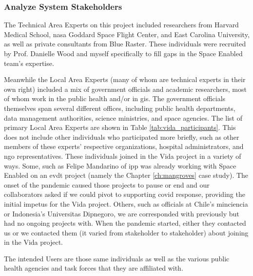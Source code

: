 \subsubsection{Analyze System Stakeholders}

The Technical Area Experts on this project included researchers from Harvard Medical School, \ac{nasa} Goddard Space Flight Center, and East Carolina University, as well as private consultants from Blue Raster. These individuals were recruited by Prof. Danielle Wood and myself specifically to fill gaps in the Space Enabled team's expertise.

Meanwhile the Local Area Experts (many of whom are technical experts in their own right) included a mix of government officials and academic researchers, most of whom work in the public health and/or in \ac{gis}. The government officials themselves span several different offices, including public health departments, data management authorities, science ministries, and space agencies. The list of primary Local Area Experts are shown in Table \ref{tab:vida_participants}. This does not include other individuals who participated more briefly, such as other members of these experts' respective organizations, hospital administrators, and \ac{ngo} representatives. These individuals joined in the Vida project in a variety of ways. Some, such as Felipe Mandarino of \ac{ipp} was already working with Space Enabled on an \ac{evdt} project (namely the Chapter \ref{ch:mangroves} case study). The onset of the pandemic caused those projects to pause or end and our collaborators asked if we could pivot to supporting \ac{covid} response, providing the initial impetus for the Vida project. Others, such as officials at Chile's \ac{minciencia} or Indonesia's Universitas Dipnegoro, we are corresponded with previously but had no ongoing projects with. When the pandemic started, either they contacted us or we contacted them (it varied from stakeholder to stakeholder) about joining in the Vida project.

The intended Users are those same individuals as well as the various public health agencies and task forces that they are affiliated with.  

